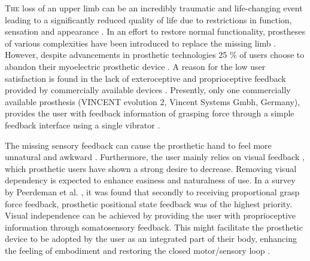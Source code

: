 

\lettrine{T}{he} loss of an upper limb can be an incredibly traumatic and life-changing event leading to a significantly reduced quality of life due to restrictions in function, sensation and appearance \cite{Schofield2014,Ostlie2011}. 
In an effort to restore normal functionality, prostheses of various complexities have been introduced to replace the missing limb \cite{Geethanjali2016}. However, despite advancements in prosthetic technologies 25 \% of users choose to abandon their myoelectric prosthetic device \cite{Biddiss2007a}. A reason for the low user satisfaction is found in the lack of exteroceptive and proprioceptive feedback provided by commercially available devices \cite{Schofield2014,Peerdeman2011}. Presently, only one commercially available prosthesis (VINCENT evolution 2, Vincent Systems Gmbh, Germany), provides the user with feedback information of grasping force through a simple feedback interface using a single vibrator \cite{Systems2005}. 
    
%
The missing sensory feedback can cause the prosthetic hand to feel more unnatural and awkward \cite{Pamungkas2015}. Furthermore, the user mainly relies on visual feedback \cite{Pamungkas2015,Stephens-Fripp2018}, which prosthetic users have shown a strong desire to decrease. Removing visual dependency is expected to enhance easiness and naturalness of use. \cite{Atkins1996}
In a survey by Peerdeman et al. \cite{Peerdeman2011}, it was found that secondly to receiving proportional grasp force feedback, prosthetic positional state feedback was of the highest priority. Visual independence can be achieved by providing the user with proprioceptive information through somatosensory feedback. This might facilitate the prosthetic device to be adopted by the user as an integrated part of their body, enhancing the feeling of embodiment and restoring the closed motor/sensory loop \cite{Stephens-Fripp2018,Xu2016,Strbac2016,Geng2012}. 

